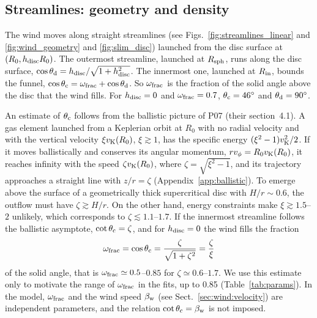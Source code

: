 \subsection{Streamlines: geometry and density}
\label{sec:wind:streamlines}

The wind moves along straight streamlines (see Figs.~\ref{fig:streamlines_linear} and \ref{fig:wind_geometry} and \ref{fig:slim_disc}) launched from the disc surface at $(R_0, h_{\rm disc} R_0)$.
The outermost streamline, launched at $R_{\rm sph}$, runs along the disc surface, $\cos\theta_{\rm d} = h_{\rm disc}/\sqrt{1 + h_{\rm disc}^2}$.
The innermost one, launched at $R_{\rm in}$, bounds the funnel, $\cos\theta_{\rm c} = \omega_{\rm frac} + \cos\theta_{\rm d}$.
So $\omega_{\rm frac}$ is the fraction of the solid angle above the disc that the wind fills.
For $h_{\rm disc} = 0$ and $\omega_{\rm frac} = 0.7$, $\theta_{\rm c} = 46^\circ$ and $\theta_{\rm d} = 90^\circ$.



An estimate of $\theta_{\rm c}$ follows from the ballistic picture of P07 (their section~4.1).
A gas element launched from a Keplerian orbit at $R_0$ with no radial velocity and with the vertical velocity $\xi v_{\rm K}(R_0)$, $\xi \gtrsim 1$, has the specific energy $(\xi^2 - 1)v_{\rm K}^2/2$.
If it moves ballistically and conserves its angular momentum, $r v_\phi = R_0v_{\rm K}(R_0)$, it reaches infinity with the speed $\zeta v_{\rm K}(R_0)$, where $\zeta = \sqrt{\xi^2 - 1}$, and its trajectory approaches a straight line with $z/r = \zeta$ (Appendix~\ref{app:ballistic}).
To emerge above the surface of a geometrically thick supercritical disc with $H/r \sim 0.6$, the outflow must have $\zeta \gtrsim H/r$.
On the other hand, energy constraints make $\xi \gtrsim 1.5$--$2$ unlikely, which corresponds to $\zeta \lesssim 1.1$--$1.7$.
If the innermost streamline follows the ballistic asymptote, $\cot\theta_{\rm c} = \zeta$, and for $h_{\rm disc} = 0$ the wind fills the fraction
\begin{equation}
\omega_{\rm frac} = \cos\theta_{\rm c} = \frac{\zeta}{\sqrt{1 + \zeta^2}} = \frac{\zeta}{\xi}
\label{eq:omega_ballistic}
\end{equation}
of the solid angle, that is $\omega_{\rm frac} \simeq 0.5$--$0.85$ for $\zeta \simeq 0.6$--$1.7$.
We use this estimate only to motivate the range of $\omega_{\rm frac}$ in the fits, up to 0.85 (Table~\ref{tab:params}).
In the model, $\omega_{\rm frac}$ and the wind speed $\beta_{\rm w}$ (see Sect.~\ref{sec:wind:velocity}) are independent parameters, and the relation $\cot\theta_{\rm c} = \beta_{\rm w}$ is not imposed.

